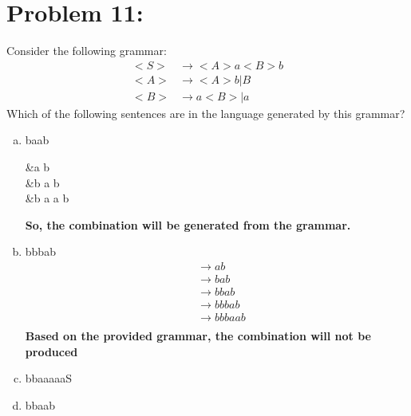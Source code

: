 \documentclass[]{article}
\begin{document}
\section*{Problem 11:}
Consider the following grammar:
\begin{align*}
	<S> &\rightarrow <A> a <B> b\\
	<A> &\rightarrow <A> b | B\\
	<B> &\rightarrow a <B> | a
\end{align*}
Which of the following sentences are in the language generated by this grammar?
\begin{enumerate}[a.]
	\item baab
	\begin{flalign*}
	&\rightarrow a b\\
	&\rightarrow b a b\\
	&\rightarrow b a a b\\
	\end{flalign*}
	\textbf{So, the combination will be generated from the grammar.}
	\item bbbab
	\begin{align*}
	&\rightarrow a b\\
	&\rightarrow b a b\\
	&\rightarrow b b a b\\
	&\rightarrow b b b a b\\
	&\rightarrow b b b a a b\\
	\end{align*}
\textbf{Based on the provided grammar, the combination will not be produced}

	\item bbaaaaaS
	\item bbaab

\end{enumerate}
\end{document}
